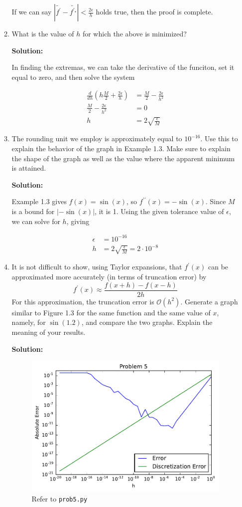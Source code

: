\documentclass[12pt]{article}
\begin{document}
\begin{enumerate}
\begin{enumerate}
If we can say $\left| \widetilde{f^{\prime}} - \widetilde{f^{\prime_{\star}}} \right| < \frac{2\epsilon}{h}$ holds true, then the proof is complete.

\item What is the value of $h$ for which the above is minimized?

{\bf Solution:}

In finding the extremas, we can take the derivative of the funciton, set it equal to zero, and then solve the system

\begin{align*}
\frac{d}{dh}\left(h\frac{M}{2} + \frac{2\epsilon}{h}\right) &= \frac{M}{2} - \frac{2\epsilon}{h^{2}}\\
\frac{M}{2} - \frac{2\epsilon}{h^{2}} &= 0\\
h &= 2\sqrt{\frac{\epsilon}{M}}
\end{align*}

\item The rounding unit we employ is approximately equal to $10^{-16}$. Use this
to explain the behavior of the graph in Example 1.3. Make sure to explain the shape
of the graph as well as the value where the apparent minimum is attained.

{\bf Solution:}

Example 1.3 gives $f(x) = \sin(x)$, so $f^{\prime\prime}(x) = -\sin(x)$. Since $M$ is a bound
for $\left| -\sin(x)\right|$, it is 1. Using the given tolerance value of $\epsilon$, we can solve
for $h$, giving

\begin{align*}
\epsilon &= 10^{-16}\\
h &= 2\sqrt{\frac{\epsilon}{M}} = 2\cdot 10^{-8}
\end{align*}

\item It is not difficult to show, using Taylor expansions, that $f^{\prime}(x)$ can
be approximated more accurately (in terms of truncation error) by
\[
f^{\prime}(x) \approx \frac{f(x+h) - f(x-h)}{2h}
\]
For this approximation, the truncation error is $\mathcal{O}\left(h^{2}\right)$.
Generate a graph similar to Figure 1.3 for the same function and the same value
of $x$, namely, for $\sin(1.2)$, and compare the two graphs. Explain the meaning
of your results.

{\bf Solution:}

\begin{figure}[H]
  \centering
  \includegraphics[width=.5\textwidth]{./hw1_prob5.pdf}
  \caption{Refer to {\tt prob5.py}}
  \label{fig:prob5}
\end{figure}


\end{enumerate}
\end{enumerate}
\end{document}

